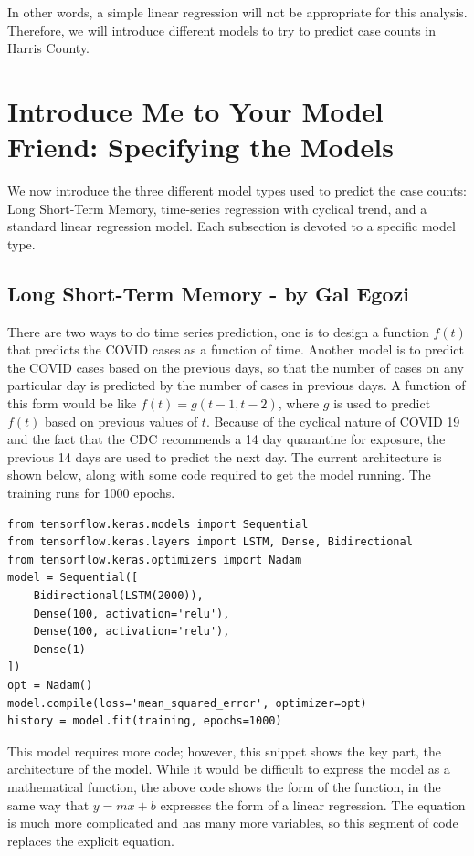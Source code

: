 \documentclass{article}
\begin{document}
In other words, a simple linear regression will not be appropriate for this analysis. Therefore, we will introduce different models to try to predict case counts in Harris County.

\section{Introduce Me to Your Model Friend: Specifying the Models}
We now introduce the three different model types used to predict the case counts: Long Short-Term Memory, time-series regression with cyclical trend, and a standard linear regression model. Each subsection is devoted to a specific model type.

\subsection{Long Short-Term Memory - by Gal Egozi}
There are two ways to do time series prediction, one is to design a function $f(t)$ that predicts the COVID cases as a function of time. Another model is to predict the COVID cases based on the previous days, so that the number of cases on any particular day is predicted by the number of cases in previous days. A function of this form would be like $f(t) = g(t-1,t-2)$, where $g$ is used to predict $f(t)$ based on previous values of $t$. Because of the cyclical nature of COVID 19 and the fact that the CDC recommends a 14 day quarantine for exposure, the previous 14 days are used to predict the next day. The current architecture is shown below, along with some code required to get the model running. The training runs for 1000 epochs.
\begin{verbatim}
from tensorflow.keras.models import Sequential
from tensorflow.keras.layers import LSTM, Dense, Bidirectional
from tensorflow.keras.optimizers import Nadam
model = Sequential([
    Bidirectional(LSTM(2000)),
    Dense(100, activation='relu'),
    Dense(100, activation='relu'),
    Dense(1)
])
opt = Nadam()
model.compile(loss='mean_squared_error', optimizer=opt)
history = model.fit(training, epochs=1000)
\end{verbatim}
This model requires more code; however, this snippet shows the key part, the architecture of the model. While it would be difficult to express the model as a mathematical function, the above code shows the form of the function, in the same way that $y=mx+b$ expresses the form of a linear regression. The equation is much more complicated and has many more variables, so this segment of code replaces the explicit equation.
\end{document}
